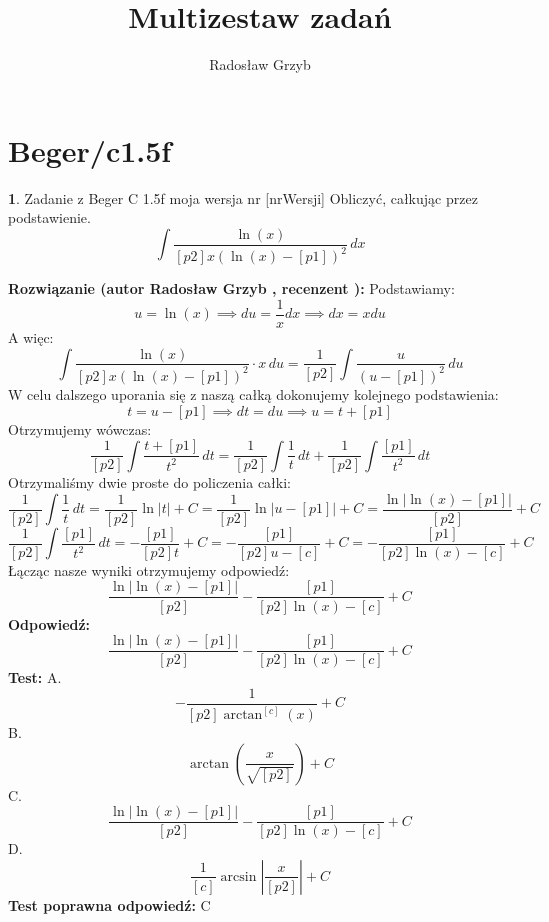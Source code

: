 \documentclass[12pt, a4paper]{article}
\title{Multizestaw zadań}
\author{Radosław Grzyb}
\date{}
\theoremstyle{definition} %
\newtheorem{zad}{}
\newcommand{\kategoria}[1]{\section{#1}} %
\newcommand{\zadStart}[1]{\begin{zad}#1\newline} %
\newcommand{\zadStop}{\end{zad}}   %
\newcommand{\rozwStart}[2]{\noindent \textbf{Rozwiązanie (autor #1 , recenzent #2): }\newline} %
\newcommand{\rozwStop}{\newline}                                            %
\newcommand{\odpStart}{\noindent \textbf{Odpowiedź:}\newline}    %
\newcommand{\odpStop}{\newline}                                             %
\newcommand{\testStart}{\noindent \textbf{Test:}\newline} %
\newcommand{\testStop}{\newline} %
\newcommand{\kluczStart}{\noindent \textbf{Test poprawna odpowiedź:}\newline} %
\newcommand{\kluczStop}{\newline} %
\begin{document}
\maketitle
\kategoria{Beger/c1.5f}
\zadStart{Zadanie z Beger C 1.5f moja wersja nr [nrWersji]}
Obliczyć, całkując przez podstawienie.
$$\int \frac{\ln(x)}{[p2]x(\ln(x)-[p1])^2} \,dx$$
\zadStop
\rozwStart{Radosław Grzyb}{}
Podstawiamy:
$$u=\ln(x) \implies du=\frac{1}{x}dx \implies dx=xdu$$
A więc:
$$\int \frac{\ln(x)}{[p2]x(\ln(x)-[p1])^2}\cdot x \,du=\frac{1}{[p2]}\int \frac{u}{(u-[p1])^2} \,du$$
W celu dalszego uporania się z naszą całką dokonujemy kolejnego podstawienia:
$$t=u-[p1]\implies dt=du \implies u=t+[p1]$$
Otrzymujemy wówczas:
$$\frac{1}{[p2]}\int \frac{t+[p1]}{t^2} \,dt=\frac{1}{[p2]}\int \frac{1}{t} \,dt+\frac{1}{[p2]}\int \frac{[p1]}{t^2} \,dt$$
Otrzymaliśmy dwie proste do policzenia całki:
$$\frac{1}{[p2]}\int \frac{1}{t} \,dt=\frac{1}{[p2]}\ln|t|+C=\frac{1}{[p2]}\ln|u-[p1]|+C=\frac{\ln|\ln(x)-[p1]|}{[p2]}+C$$
$$\frac{1}{[p2]}\int \frac{[p1]}{t^2} \,dt=-\frac{[p1]}{[p2]t}+C=-\frac{[p1]}{[p2]u-[c]}+C=-\frac{[p1]}{[p2]\ln(x)-[c]}+C$$
Łącząc nasze wyniki otrzymujemy odpowiedź:
$$\frac{\ln|\ln(x)-[p1]|}{[p2]}-\frac{[p1]}{[p2]\ln(x)-[c]}+C$$
\rozwStop
\odpStart
$$\frac{\ln|\ln(x)-[p1]|}{[p2]}-\frac{[p1]}{[p2]\ln(x)-[c]}+C$$
\odpStop
\testStart
A.$$-\frac{1}{[p2]\arctan^{[c]}(x)}+C$$
B.$$\arctan(\frac{x}{\sqrt{[p2]}})+C$$
C.$$\frac{\ln|\ln(x)-[p1]|}{[p2]}-\frac{[p1]}{[p2]\ln(x)-[c]}+C$$
D.$$\frac{1}{[c]}\arcsin|\frac{x}{[p2]}|+C$$
\testStop
\kluczStart
C
\kluczStop
\end{document}
